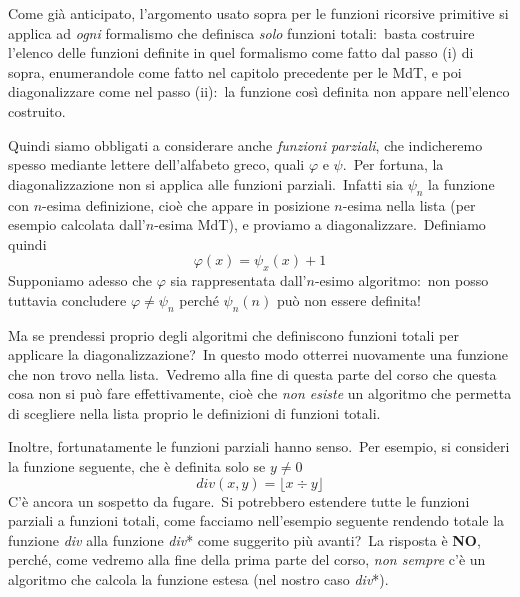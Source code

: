 \noindent Come già anticipato, l'argomento usato sopra per le funzioni ricorsive primitive si applica ad \textit{ogni} formalismo che definisca \textit{solo} funzioni totali:\ basta costruire l'elenco delle funzioni definite in quel formalismo come fatto dal passo (i) di sopra, enumerandole come fatto nel capitolo precedente per le MdT, e poi diagonalizzare come nel passo (ii):\ la funzione così definita non appare nell'elenco costruito.\

Quindi siamo obbligati a considerare anche \textit{funzioni parziali}, che indicheremo spesso mediante lettere dell'alfabeto greco, quali $\varphi$ e $\psi$.\
Per fortuna, la diagonalizzazione non si applica alle funzioni parziali.\
Infatti sia $\psi_n$ la funzione con $n$-esima definizione, cioè che appare in posizione $n$-esima nella lista (per esempio calcolata dall'$n$-esima MdT), e proviamo a diagonalizzare.\
Definiamo quindi
\[\varphi(x) = \psi_x(x) + 1\]
Supponiamo adesso che $\varphi$ sia rappresentata dall'$n$-esimo algoritmo:\ non posso tuttavia concludere $\varphi \neq \psi_n$ perché $\psi_n(n)$ può non essere definita!

Ma se prendessi proprio degli algoritmi che definiscono funzioni totali per applicare la diagonalizzazione?\
In questo modo otterrei nuovamente una funzione che non trovo nella lista.\
Vedremo alla fine di questa parte del corso che questa cosa non si può fare effettivamente, cioè che \textit{non esiste} un algoritmo che permetta di scegliere nella lista proprio le definizioni di funzioni totali.\

Inoltre, fortunatamente le funzioni parziali hanno senso.\
Per esempio, si consideri la funzione seguente, che è definita solo se $y\neq 0$
\[\mathit{div}(x,y)= \lfloor x \div y \rfloor\]
C'è ancora un sospetto da fugare.\
Si potrebbero estendere tutte le funzioni parziali a funzioni totali, come facciamo nell'esempio seguente rendendo totale la funzione \textit{div} alla funzione \textit{div}* come suggerito più avanti?\
La risposta è \textbf{NO}, perché, come vedremo alla fine della prima parte del corso, \textit{non sempre} c'è un algoritmo che calcola la funzione estesa (nel nostro caso \textit{div}*).\

